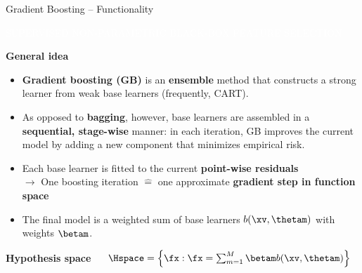 \documentclass[11pt,compress,t,notes=noshow, xcolor=table]{beamer}
\newcommand{\maketag}[1]{\colorbox{highlightcol}{\textcolor{white}
{\MakeUppercase{#1}}}}
\newcommand{\highlight}[1]{\textcolor{highlightcol}{\textbf{#1}}}
\begin{document}
\begin{frame}{Gradient Boosting -- Functionality}

\footnotesize

\maketag{supervised}
\maketag{NON-PARAMETRIC}
\maketag{BLACK-BOX}
\maketag{FEATURE SELECTION}

\medskip

\highlight{General idea}

\begin{itemize}
  \item \textbf{Gradient boosting (GB)} is an \textbf{ensemble} method that 
  constructs a strong learner from weak base learners (frequently, CART).
  \item As opposed to \textbf{bagging}, however, base learners are assembled in a 
  \textbf{sequential, stage-wise} manner: in each iteration, GB improves the 
  current model by adding a new component that minimizes empirical risk.
  \item Each base learner is fitted to the current \textbf{point-wise residuals} 
  \\ $\rightarrow$ One boosting iteration $\widehat{=}$ one approximate 
  \textbf{gradient step in function space}
  \item The final model is a weighted sum of base learners $b(\xv, \thetam)$ 
  with weights $\betam$.
\end{itemize}

\medskip

\highlight{Hypothesis space} ~~
$\Hspace = \left\{ \fx: \fx = \sum_{m = 1}^M \betam b(\xv, \thetam) \right\}$


\end{frame}
\end{document}
